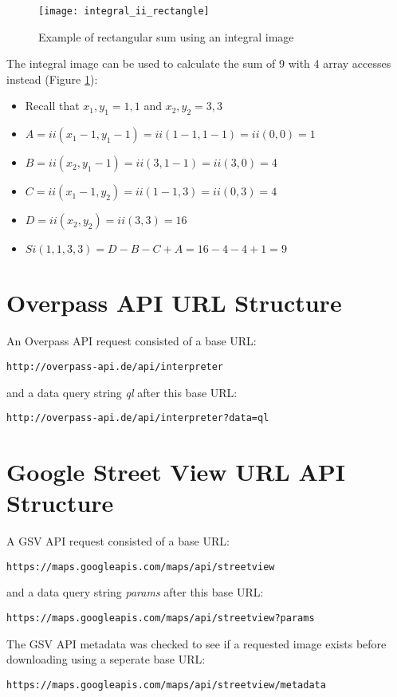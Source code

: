 \begin{figure}[H]
  \centering
  \texttt{[image: integral\_ii\_rectangle]}
  \caption{Example of rectangular sum using an integral image}
  \label{fig:integral-ii-rectangle}
\end{figure}

The integral image can be used to calculate the sum of 9 with 4 array accesses instead (Figure \ref{fig:integral-ii-rectangle}):

\begin{itemize}
  \item Recall that $x_1, y_1 = 1,1$ and $x_2, y_2 = 3,3$
  \item $A = ii(x_1 - 1,y_1 - 1) = ii(1 - 1, 1 - 1) = ii(0, 0) = 1$
  \item $B = ii(x_2,y_1 - 1)=ii(3, 1 - 1) = ii(3, 0) = 4$
  \item $C = ii(x_1 - 1, y_2) = ii(1-1,3) = ii(0, 3) = 4$
  \item $D = ii(x_2,y_2)=ii(3,3)=16$
  \item $Si(1, 1, 3, 3) = D - B - C + A = 16 - 4 - 4 + 1 = 9$
\end{itemize}

\section{Overpass API URL Structure} \label{overpass-api-url-structure}

An Overpass API request consisted of a base URL: 

\begin{verbatim}
http://overpass-api.de/api/interpreter
\end{verbatim}

and a data query string \textit{ql} after this base URL:

\begin{verbatim}
http://overpass-api.de/api/interpreter?data=ql
\end{verbatim}

\section{Google Street View URL API Structure} \label{google-street-view-url-structure}

A GSV API request consisted of a base URL:

\begin{verbatim}
https://maps.googleapis.com/maps/api/streetview
\end{verbatim}

and a data query string \textit{params} after this base URL:

\begin{verbatim}
https://maps.googleapis.com/maps/api/streetview?params
\end{verbatim}

The GSV API metadata was checked to see if a requested image exists before downloading using a seperate base URL:

\begin{verbatim}
https://maps.googleapis.com/maps/api/streetview/metadata
\end{verbatim}